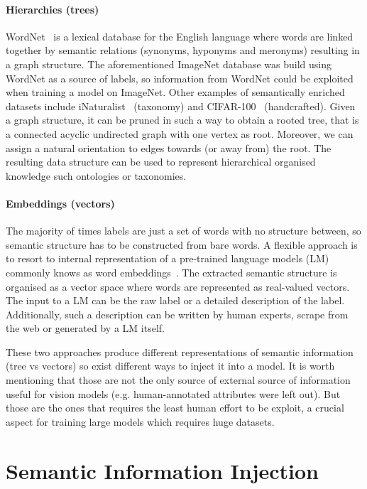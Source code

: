 \paragraph{Hierarchies (trees)}
\label{par:hierarchies-tree}
WordNet~\cite{WordnetMi1995} is a lexical database for the English language
where words are linked together by semantic relations (synonyms, hyponyms and
meronyms) resulting in a graph structure. The aforementioned ImageNet database
was build using WordNet as a source of labels, so information from WordNet could
be exploited when training a model on ImageNet. Other examples of semantically
enriched datasets include iNaturalist~\cite{TheInaturalistHorn2017} (taxonomy)
and CIFAR-100~\cite{LearningMultipKrizhe2009} (handcrafted). Given a graph
structure, it can be pruned in such a way to obtain a rooted tree, that is a
connected acyclic undirected graph with one vertex as root. Moreover, we can
assign a natural orientation to edges towards (or away from) the root. The
resulting data structure can be used to represent hierarchical organised
knowledge such ontologies or taxonomies.

\paragraph{Embeddings (vectors)}
\label{par:embeddings-vectors}
The majority of times labels are just a set of words with no structure between,
so semantic structure has to be constructed from bare words. A flexible
approach is to resort to internal representation of a pre-trained language
models (LM) commonly knows as word embeddings~\cite{BeyondWordEmbIncitt2023}.
The extracted semantic structure is organised as a vector space where words are
represented as real-valued vectors. The input to a LM can be the raw label or a
detailed description of the label. Additionally, such a description can be written
by human experts, scrape from the web or generated by a LM itself.\medskip

These two approaches produce different representations of semantic information
(tree vs vectors) so exist different ways to inject it into a model. It is
worth mentioning that those are not the only source of external source of
information useful for vision models (e.g. human-annotated attributes were left
out). But those are the ones that requires the least human effort to be
exploit, a crucial aspect for training large models which requires huge
datasets.

\section{Semantic Information Injection}
\label{sec:semantic-information-injection}


